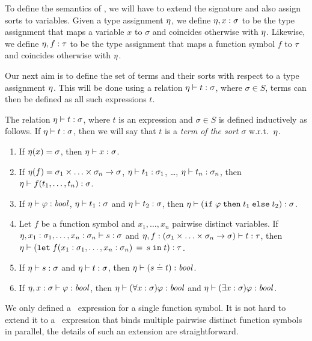 To define the semantics of \folb, we will have to extend the signature and also assign sorts to variables. Given a type assignment $\eta$, we define $\eta,x:\sigma$ to be the type assignment that maps a variable $x$ to $\sigma$ and coincides otherwise with $\eta$. Likewise, we define $\eta,f:\tau$ to be the type assignment that maps a function symbol $f$ to $\tau$ and coincides otherwise with $\eta$.

Our next aim is to define the set of terms and their sorts with respect to a type assignment $\eta$. This will be done using a relation $\eta \vdash t:\sigma$, where $\sigma \in S$, terms can then be defined as all such expressions $t$.

\begin{definition}\label{def:folb-terms}\rm
  The relation $\eta \vdash t:\sigma$, where $t$ is an expression and $\sigma \in S$ is defined inductively as follows. If $\eta \vdash t:\sigma$, then we will say that $t$ is a \emph{term of the sort $\sigma$} w.r.t.\ $\eta$.
  \begin{enumerate}
    \item If $\eta(x) = \sigma$, then $\eta \vdash x:\sigma$.

    \item If $\eta(f) = \sigma_1 \times \ldots \times \sigma_n \to \sigma$, $\eta \vdash t_1:\sigma_1$, \ldots, $\eta \vdash t_n:\sigma_n$, then $\eta \vdash  f(t_1, \ldots, t_n) : \sigma$.

    \item If $\eta \vdash \varphi:\mathit{bool}$, $\eta \vdash t_1:\sigma$ and $\eta \vdash t_2:\sigma$, then $\eta \vdash (\mathtt{if}\;{\varphi}\;\allowbreak\mathtt{then}\;{t_1}\;\allowbreak\mathtt{else}\;{t_2}):\sigma$.

    \item Let $f$ be a function symbol and $x_1,\ldots,x_n$ pairwise distinct variables. If $\eta,x_1:\sigma_1,\ldots,x_n:\sigma_n \vdash s:\sigma$ and $\eta,f:(\sigma_1\times \ldots \times\sigma_n \to\sigma) \vdash t : \tau$, then $\eta \vdash (\mathtt{let}\;{f(x_1:\sigma_1, \ldots, x_n:\sigma_n)}\,=\,{s}\;\allowbreak\mathtt{in}\;{t}) : \tau$.

    \item If $\eta \vdash  s:\sigma$ and $\eta \vdash  t:\sigma$, then $\eta \vdash (s \doteq t) : \mathit{bool}$.

    \item If $\eta,x : \sigma \vdash \varphi : \mathit{bool}$, then $\eta \vdash (\forall x : \sigma)\varphi : \mathit{bool}$ and $\eta \vdash (\exists x:\sigma)\varphi : \mathit{bool}$. \QED
  \end{enumerate}
\end{definition}
We only defined a \LETIN\ expression for a single function symbol. It is not hard to extend it to a \LETIN\ expression that binds multiple pairwise distinct function symbols in parallel, the details of such an extension are straightforward.

